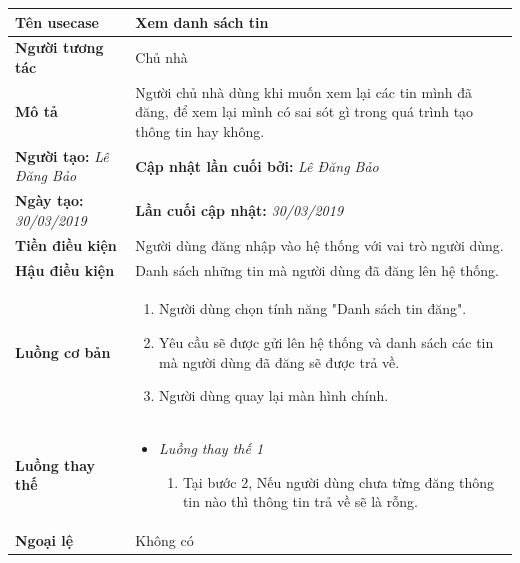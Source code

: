 \begin{center}
	\begin{longtable}{ | l |p{10cm}|}
		\hline
		\textbf{Tên usecase} & Xem danh sách tin \\ \hline
		\textbf{Người tương tác} & Chủ nhà \\ \hline   
		\textbf{Mô tả} &  Người chủ nhà dùng khi muốn xem lại các tin mình đã đăng, để xem lại mình có sai sót gì trong quá trình tạo thông tin hay không.\\ \hline  
		\textbf{Người tạo:} \textit{Lê Đăng Bảo} & \textbf{Cập nhật lần cuối bởi:} \textit{Lê Đăng Bảo} \\ \hline
		\textbf{Ngày tạo:} \textit{30/03/2019} & \textbf{Lần cuối cập nhật:} \textit{30/03/2019} \\ \hline
		\textbf{Tiền điều kiện} &  Người dùng đăng nhập vào hệ thống với vai trò người dùng. \\ \hline 
		\textbf{Hậu điều kiện} &  Danh sách những tin mà người dùng đã đăng lên hệ thống. \\ \hline 
		\textbf{Luồng cơ bản} & 
		\begin{enumerate}
			\item Người dùng chọn tính năng "Danh sách tin đăng".
			\item Yêu cầu sẽ được gửi lên hệ thống và danh sách các tin mà người dùng đã đăng sẽ được trả về.
			\item Người dùng quay lại màn hình chính.
			
		\end{enumerate} \\ \hline 
		\textbf{Luồng thay thế} & 
		\begin{itemize} 
			\item \textit{Luồng thay thế 1}
			\begin{enumerate}
				\item Tại bước 2, Nếu người dùng chưa từng đăng thông tin nào thì thông tin trả về sẽ là rỗng.
			\end{enumerate}

		\end{itemize} \\ \hline 
		\textbf{Ngoại lệ}  & Không có \\
		\hline
	\end{longtable}
\end{center}

